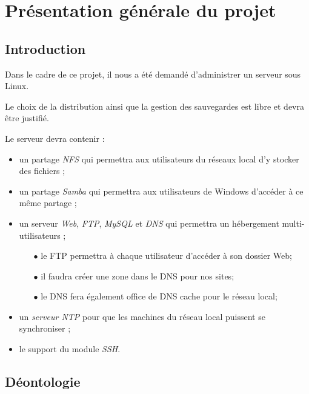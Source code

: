 \section{Présentation générale du projet}
\label{sec:pres-gener-du}

\subsection{Introduction}
\label{subsec:introduction}

Dans le cadre de ce projet, il nous a été demandé d'administrer un serveur sous
Linux.

Le choix de la distribution ainsi que la gestion des sauvegardes est libre et
devra être justifié.

Le serveur devra contenir :

\begin{itemize}
\item un partage \emph{NFS} qui permettra aux utilisateurs du réseaux local
  d'y stocker des fichiers ;

\item un partage \emph{Samba} qui permettra aux utilisateurs de Windows
  d'accéder à ce même partage ;

\item un serveur \emph{Web}, \emph{FTP}, \emph{MySQL} et \emph{DNS} qui
  permettra un hébergement multi-utilisateurs ;

  \begin{itemize}
  \item[$\bullet$] le FTP permettra à chaque utilisateur d'accéder à son dossier Web;
  \item[$\bullet$] il faudra créer une zone dans le DNS pour nos sites;
  \item[$\bullet$] le DNS fera également office de DNS cache pour le réseau local;
  \end{itemize}

\item un \emph{serveur NTP} pour que les machines du
  réseau local puissent se synchroniser ;

\item le support du module \emph{SSH}.
\end{itemize}

\newpage

\subsection{Déontologie}
\label{subsec:déontologie}


